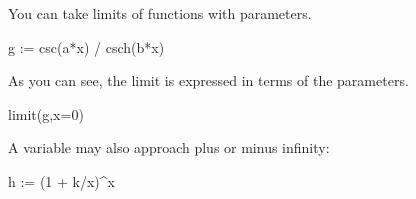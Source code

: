 {{{{{{{{\begin{xtc}
\begin{xtccomment}
You can take limits of functions with parameters.
\end{xtccomment}
\begin{spadsrc}
g := csc(a*x) / csch(b*x) 
\end{spadsrc}
\begin{TeXOutput}
\begin{fricasmath}{1}
%
\end{fricasmath}
\end{TeXOutput}
\end{xtc}
\begin{xtc}
\begin{xtccomment}
As you can see, the limit is expressed in terms of the parameters.
\end{xtccomment}
\begin{spadsrc}
limit(g,x=0) 
\end{spadsrc}
\begin{TeXOutput}
\begin{fricasmath}{2}
%
\end{fricasmath}
\end{TeXOutput}
\end{xtc}
%
\begin{xtc}
\begin{xtccomment}
A variable may also approach plus or minus infinity:
\end{xtccomment}
\begin{spadsrc}
h := (1 + k/x)^x 
\end{spadsrc}
\begin{TeXOutput}
\begin{fricasmath}{3}
%
\end{fricasmath}
\end{TeXOutput}
\end{xtc}
\begin{xtc}
\begin{spadsrc}

\end{spadsrc}
\end{xtc}}}}}}}}}
